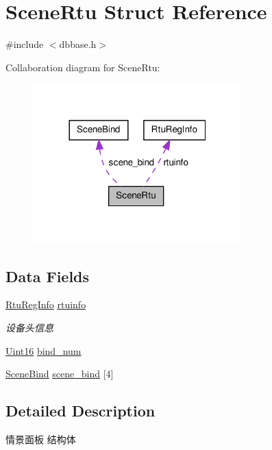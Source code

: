 \hypertarget{structSceneRtu}{\section{Scene\-Rtu Struct Reference}
\label{structSceneRtu}
}


{\ttfamily \#include $<$dbbase.\-h$>$}



Collaboration diagram for Scene\-Rtu\-:\nopagebreak
\begin{figure}[H]
\begin{center}
\leavevmode
\includegraphics[width=228pt]{structSceneRtu__coll__graph}
\end{center}
\end{figure}
\subsection*{Data Fields}
\begin{DoxyCompactItemize}
\item 
\hyperlink{structRtuRegInfo}{Rtu\-Reg\-Info} \hyperlink{structSceneRtu_a8850884f48b4d42495efce8ba6cdab7b}{rtuinfo}
\begin{DoxyCompactList}\small\item\em 设备头信息 \end{DoxyCompactList}\item 
\hyperlink{base_8h_ae9f2e1f80fbd243687a04febbf590e13}{Uint16} \hyperlink{structSceneRtu_aa094ff659f108ee77a08b35bcba85bb6}{bind\-\_\-num}
\item 
\hyperlink{structSceneBind}{Scene\-Bind} \hyperlink{structSceneRtu_a308c1e20b977bbfcf203751cecac8e2f}{scene\-\_\-bind} \mbox{[}4\mbox{]}
\end{DoxyCompactItemize}


\subsection{Detailed Description}
情景面板 结构体 


